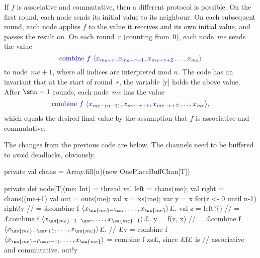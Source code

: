 \begin{answerI}


If $f$ is associative and commutative, then a different protocol is possible.
On the first round, each node sends its initial value to its neighbour.  On
each subsequent round, each node applies $f$ to the value it receives and its
own initial value, and passes the result on.  On each round~$r$ (counting
from~0), each node~$me$ sends the value
\[\mstyle
\mathrm{combine}~f~ \seq{x_{me-r}, x_{me-r+1}, x_{me-r+2} \ldots, x_{me}}
\]
to node~$me+1$, where all indices are interpreted mod $n$.  The code has an
invariant that at the start of round~$r$, the variable |y| holds the above value.
%
After $\sm n-1$ rounds, each node~$me$ has the value
\[\mstyle
\mathrm{combine}~f~ \seq{x_{me-(n-1)}, x_{me-r+1}, x_{me-r+2} \ldots, x_{me}},
\]
which equals  the desired final value by the assumption that $f$ is
associative and commutative.

The changes from the previous code are below.  The channels need to be
buffered to avoid deadlocks, obviously.
%
\begin{scala}
  private val chans = Array.fill(n)(new OnePlaceBuffChan[T]) 

  private def node[T](me: Int) = thread{
    val left = chans(me); val right = chans((me+1)%
    val out = outs(me); val x = xs(me); var y = x
    for(r <- 0 until n-1){
      right!y         // = £combine f $\seq{x_{\ss{me}-\ss r}, \ldots, x_{\ss{me}}}$£.
      val z = left?() // = £combine f $\seq{x_{\ss{me}-1-\ss r}, \ldots, x_{\ss{me}-1}}$£.
      y = f(z, x)     // = £combine f $\seq{x_{\ss{me}-\ss r+1}, \ldots, x_{\ss{me}}}$£.
    }
    // £y = combine f $\seq{x_{\ss{me}-(\ss n-1)}, \ldots, x_{\ss{me}}}$ = combine f xs£, since £f£ is
    // associative and commutative.
    out!y
  }  
\end{scala}
%


\end{answerI}
